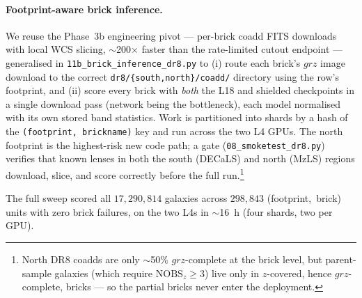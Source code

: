 \documentclass[11pt,letterpaper]{article}
\begin{document}
\paragraph{Footprint-aware brick inference.} We reuse the Phase~3b engineering
pivot --- per-brick coadd FITS downloads with local WCS slicing, $\sim$200$\times$
faster than the rate-limited cutout endpoint --- generalised in
\texttt{11b\_brick\_inference\_dr8.py} to (i) route each brick's $grz$ image
download to the correct \texttt{dr8/\{south,north\}/coadd/} directory using the
row's footprint, and (ii) score every brick with \emph{both} the L18 and
shielded checkpoints in a single download pass (network being the bottleneck),
each model normalised with its own stored band statistics. Work is partitioned
into shards by a hash of the \texttt{(footprint, brickname)} key and run across
the two L4 GPUs. The north footprint is the highest-risk new code path; a
gate (\texttt{08\_smoketest\_dr8.py}) verifies that known lenses in both the
south (DECaLS) and north (MzLS) regions download, slice, and score correctly
before the full run.\footnote{North DR8 coadds are only $\sim$50\% $grz$-complete
at the brick level, but parent-sample galaxies (which require $\mathrm{NOBS}_z\ge3$)
live only in $z$-covered, hence $grz$-complete, bricks --- so the partial bricks
never enter the deployment.}

The full sweep scored all $17{,}290{,}814$ galaxies across $298{,}843$
(footprint,~brick) units with zero brick failures, on the two L4s in
$\sim$16~h (four shards, two per GPU).
\end{document}
